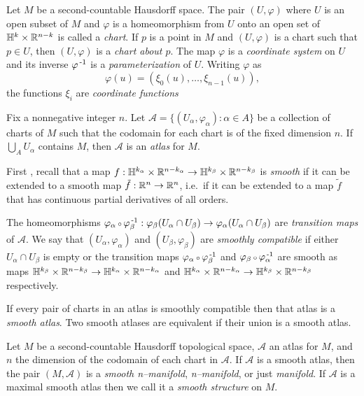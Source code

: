 \begin{defn}[Coordinates]
	\label{def:coordinates}
	Let $M$ be a second-countable Hausdorff space.
	The pair $(U,\varphi)$ where $U$ is an open subset of $M$ and $\varphi$ is a homeomorphism from $U$ onto an open set of $\mathbb{H}^k\times\mathbb{R}^{n-k}$ is called a \emph{chart}.
	If $p$ is a point in $M$ and $(U,\varphi)$ is a chart such that $p\in U$, then $(U,\varphi)$ is a \emph{chart about $p$}.
	The map $\varphi$ is a \emph{coordinate system} on $U$ and its inverse $\varphi^{\,\text{-}1}$ is a \emph{parameterization} of $U$.
	Writing $\varphi$ as
	\[
		\varphi(u) = (\xi_0(u),\dots,\xi_{n-1}(u)),
	\]
	the functions $\xi_i$ are \emph{coordinate functions}	
\end{defn}

\begin{defn}[Atlas]
	\label{def:atlas}
	Fix a nonnegative integer $n$.
	Let $\mathcal{A}=\{(U_\alpha,\varphi_\alpha):\alpha\in A\}$ be a collection of charts of $M$ such that the codomain for each chart is of the fixed dimension $n$.
	If $\bigcup_A U_\alpha$ contains $M$, then $\mathcal{A}$ is an \emph{atlas} for $M$.
	
	First , recall that a map $f:\mathbb{H}^{k_\alpha}\times\mathbb{R}^{n-k_\alpha}\to\mathbb{H}^{k_\beta}\times\mathbb{R}^{n-k_\beta}$ is \emph{smooth} if it can be extended to a smooth map $\tilde{f}:\mathbb{R}^n\to\mathbb{R}^n$, i.e.\ if it can be extended to a map $\tilde{f}$ that has continuous partial derivatives of all orders.
	
	The homeomorphisms $\varphi_\alpha\comp \varphi_\beta\inv:\varphi_\beta(U_\alpha\cap U_\beta)\to \varphi_\alpha(U_\alpha\cap U_\beta)$ are \emph{transition maps} of $\mathcal{A}$.
	We say that $(U_\alpha,\varphi_\alpha)$ and $(U_\beta,\varphi_\beta)$ are \emph{smoothly compatible} if either $U_\alpha\cap U_\beta$ is empty or the transition maps $\varphi_\alpha\comp \varphi_\beta\inv$ and $\varphi_\beta\comp \varphi_\alpha\inv$ are smooth as maps $\mathbb{H}^{k_\beta}\times\mathbb{R}^{n-k_\beta}\to\mathbb{H}^{k_\alpha}\times\mathbb{R}^{n-k_\alpha}$ and  $\mathbb{H}^{k_\alpha}\times\mathbb{R}^{n-k_\alpha}\to\mathbb{H}^{k_\beta}\times\mathbb{R}^{n-k_\beta}$ respectively.
	

	If every pair of charts in an atlas is smoothly compatible then that atlas is a \emph{smooth atlas}.
	Two smooth atlases are equivalent if their union is a smooth atlas.
\end{defn}

\begin{defn}[Manifold]
	\label{def:manifold}
	Let $M$ be a second-countable Hausdorff topological space, $\mathcal{A}$ an atlas for $M$, and $n$ the dimension of the codomain of each chart in $\mathcal{A}$.
	If $\mathcal{A}$ is a smooth atlas, then the pair $(M,\mathcal{A})$ is a \emph{smooth n--manifold},  \emph{n--manifold}, or just \emph{manifold}.
	If $\mathcal{A}$ is a maximal smooth atlas then we call it a \emph{smooth structure} on $M$.
\end{defn}

